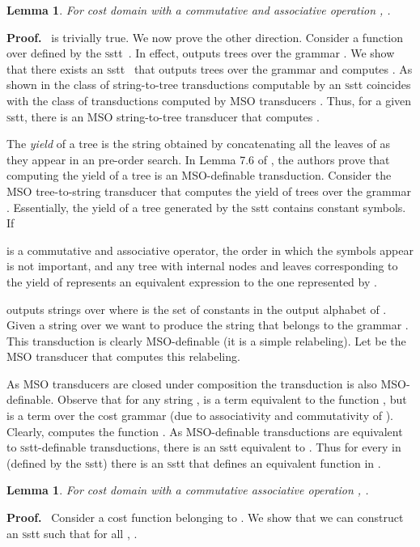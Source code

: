 \documentclass[11pt]{article}
\newtheorem{lemma}[theorem]{Lemma}
\def\Proof{{\bf Proof.}}
\def\qed{{\bf }}
\def\qed{{\bf }}
\newcommand{\SSTT}{{\sc\textsc sstt}\xspace}
\begin{document}
\begin{lemma}
\label{ssttostt}
For cost domain  with a commutative and associative operation
,
.
\end{lemma}
\Proof~  is
trivially true.  We now prove the other direction.  Consider a
function  over 
defined by the \SSTT~. In effect,  outputs trees over the
grammar .  We show that there exists an \SSTT~ that
outputs trees over the grammar  and computes .  As
shown in \cite{alur_stt_2011} the class of string-to-tree
transductions computable by an \SSTT coincides with the class of
transductions computed by MSO transducers
\cite{engelfriet_macro2_1999}. Thus, for a given \SSTT , there
is an MSO string-to-tree transducer  that computes .

The {\em yield} of a tree  is the string obtained by concatenating all
the leaves of  as they appear in an pre-order search.  In Lemma 7.6
of \cite{engelfriet_macro2_1999}, the authors prove that computing the
yield of a tree is an MSO-definable transduction.  Consider the MSO
tree-to-string transducer  that computes the yield of trees over
the grammar .  Essentially, the yield of a tree 
generated by the \SSTT  contains constant symbols. If

is a commutative and associative operator, the order in which the
symbols appear is not important, and any tree  with internal nodes
 and leaves corresponding to the yield of  represents an
equivalent expression to the one represented by .

 outputs strings over  where  is the set of constants in the
output alphabet of .  Given a string  over  we
want to produce the string  that belongs to the grammar
. This transduction is clearly MSO-definable (it is a
simple relabeling). Let  be the MSO transducer that computes this
relabeling.

As MSO transducers are closed under composition
\cite{engelfriet_macro2_1999} the transduction  is also MSO-definable.  Observe that for any string ,  is a term equivalent to the function ,
but is a term over the cost grammar  (due to
associativity and commutativity of ).  Clearly,
 computes the function .  As MSO-definable transductions are
equivalent to \SSTT-definable transductions, there is an \SSTT
 equivalent to . Thus for every  in
 (defined by the \SSTT ) there is an
\SSTT  that defines an equivalent function in
.
\qed

\begin{lemma}
\label{mvcmrtosst}
For cost domain  with a commutative associative operation ,
.
\end{lemma}
\Proof~ Consider a cost function  belonging
to .  We show that we can construct an \SSTT
 such that for all , .
\end{document}
